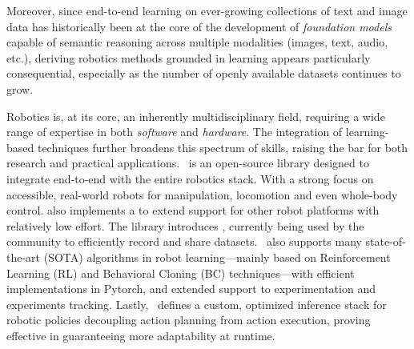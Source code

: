 Moreover, since end-to-end learning on ever-growing collections of text and image data has historically been at the core of the development of \emph{foundation models} capable of semantic reasoning across multiple modalities (images, text, audio, etc.), deriving robotics methods grounded in learning appears particularly consequential, especially as the number of openly available datasets continues to grow.

Robotics is, at its core, an inherently multidisciplinary field, requiring a wide range of expertise in both \emph{software} and \emph{hardware}.
The integration of learning-based techniques further broadens this spectrum of skills, raising the bar for both research and practical applications.
\lerobot~is an open-source library designed to integrate end-to-end with the entire robotics stack.
With a strong focus on accessible, real-world robots  for manipulation, locomotion and even whole-body control.
\lerobot also implements a  to extend support for other robot platforms with relatively low effort. 
The library introduces \lerobotdataset,  currently being used by the community to efficiently record and share datasets.
\lerobot~also supports many state-of-the-art (SOTA) algorithms in robot learning---mainly based on Reinforcement Learning (RL) and Behavioral Cloning (BC) techniques---with efficient implementations in Pytorch, and extended support to experimentation and experiments tracking.
Lastly, \lerobot~defines a custom, optimized inference stack for robotic policies decoupling action planning from action execution, proving effective in guaranteeing more adaptability at runtime.

